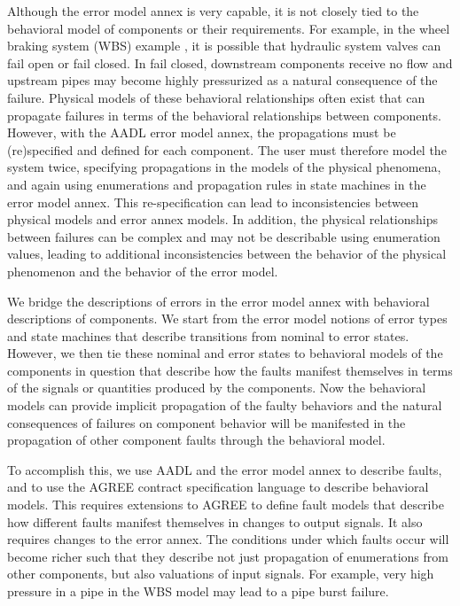 Although the error model annex is very capable, it is not closely tied to the behavioral model of components or their requirements. For example, in the wheel braking system (WBS) example \cite{AIR6110}, it is possible that hydraulic system valves can fail open or fail closed. In fail closed, downstream components receive no flow and upstream pipes may become highly pressurized as a natural consequence of the failure. Physical models of these behavioral relationships often exist that can propagate failures in terms of the behavioral relationships between components. However, with the AADL error model annex, the propagations must be (re)specified and defined for each component. The user must therefore model the system twice, specifying propagations in the models of the physical phenomena, and again using enumerations and propagation rules in state machines in the error model annex. This re-specification can lead to inconsistencies between physical models and error annex models. In addition, the physical relationships between failures can be complex and may not be describable using enumeration values, leading to additional inconsistencies between the behavior of the physical phenomenon and the behavior of the error model.

We bridge the descriptions of errors in the error model annex with behavioral descriptions of components. We start from the error model notions of error types and state machines that describe transitions from nominal to error states. However, we then tie these nominal and error states to behavioral models of the components in question that describe how the faults manifest themselves in terms of the signals or quantities produced by the components. Now the behavioral models can provide implicit propagation of the faulty behaviors and the natural consequences of failures on component behavior will be manifested in the propagation of other component faults through the behavioral model.

To accomplish this, we use AADL and the error model annex to describe faults, and to use the AGREE contract specification language to describe behavioral models. This requires extensions to AGREE to define fault models that describe how different faults manifest themselves in changes to output signals. It also requires changes to the error annex. The conditions under which faults occur will become richer such that they describe not just propagation of enumerations from other components, but also valuations of input signals. For example, very high pressure in a pipe in the WBS model may lead to a pipe burst failure.